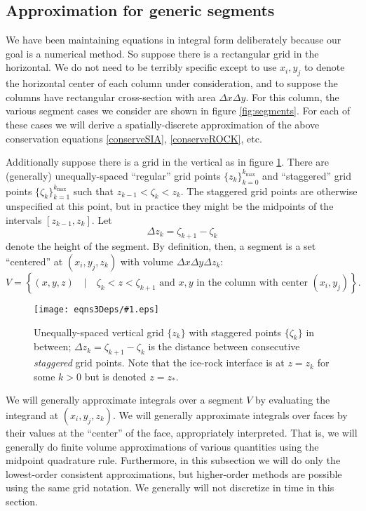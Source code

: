 \documentclass[12pt,final]{amsart}%
\theoremstyle{plain}
\theoremstyle{definition}
\theoremstyle{remark}
\newcommand{\regfigure}[2]{\texttt{[image: eqns3Deps/\#1.eps]}}
\begin{document}
\subsection*{Approximation for generic segments}  We have been maintaining equations in integral form deliberately because our goal is a numerical method.  So suppose there is a rectangular grid in the horizontal.  We do not need to be terribly specific except to use $x_i,y_j$ to denote the horizontal center of each column under consideration, and to suppose the columns have rectangular cross-section with area $\Delta x\Delta y$.  For this column, the various segment cases we consider are shown in figure \ref{fig:segments}.  For each of these cases we will derive a spatially-discrete approximation of the above conservation equations \eqref{conserveSIA}, \eqref{conserveROCK}, etc.

Additionally suppose there is a grid in the vertical as in figure \ref{fig:verticalgrid}.  There are (generally) unequally-spaced ``regular'' grid points $\{z_k\}_{k=0}^{k_{\max}}$ and ``staggered'' grid points $\{\zeta_k\}_{k=1}^{k_{\max}}$ such that $z_{k-1} < \zeta_k < z_k$.  The staggered grid points are otherwise unspecified at this point, but in practice they might be the midpoints of the intervals $[z_{k-1},z_k]$.  Let
    $$\Delta z_k = \zeta_{k+1} - \zeta_k$$
denote the height of the segment.  By definition, then, a segment is a set ``centered'' at $(x_i,y_j, z_k)$ with volume $\Delta x \Delta y \Delta z_k$:
    $$V = \left\{(x,y,z) \quad\big|\quad \zeta_k < z < \zeta_{k+1} \text{ and } x, y \text{ in the column with center } (x_i,y_j) \right\}.$$

\begin{figure}[ht]
\vspace{0.2in}
\regfigure{verticalgrid}{4.0}
\vspace{0.2in}
\caption{Unequally-spaced vertical grid $\{z_k\}$ with staggered points $\{\zeta_k\}$ in between; $\Delta z_k= \zeta_{k+1} - \zeta_k$ is the distance between consecutive \emph{staggered} grid points.  Note that the ice-rock interface is at $z=z_k$ for some $k>0$ but is denoted $z=z_\ast$.}
\label{fig:verticalgrid}
\end{figure}

We will generally approximate integrals over a segment $V$ by evaluating the integrand at $(x_i,y_j, z_k)$.  We will generally approximate integrals over faces by their values at the ``center'' of the face, appropriately interpreted.  That is, we will generally do finite volume approximations of various quantities using the midpoint quadrature rule.  Furthermore, in this subsection we will do only the lowest-order consistent approximations, but higher-order methods are possible using the same grid notation.  We generally will not discretize in time in this section.
\end{document}
